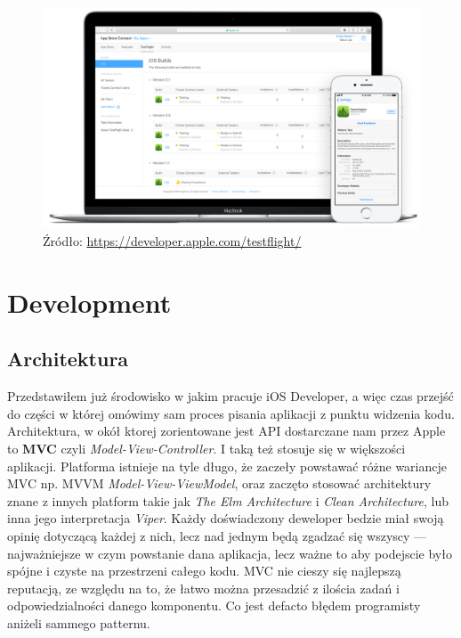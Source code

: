 \documentclass{article}
\begin{document}
\begin{figure}[h]
\centering
\includegraphics[width=12cm]{testflight-overview-hero-large_2x}
\caption{Źródło: \url{https://developer.apple.com/testflight/}}
\end{figure}


%
%
\section*{Development}
\subsection*{Architektura}
Przedstawiłem już środowisko w jakim pracuje iOS Developer, a więc czas przejść
do części w której omówimy sam proces pisania aplikacji z punktu widzenia kodu.
Architektura, w okół ktorej zorientowane jest API dostarczane nam przez Apple
to \textbf{MVC} czyli \textit{Model-View-Controller}. I taką też stosuje się w 
większości aplikacji. Platforma istnieje na tyle długo, że zaczeły powstawać różne
wariancje MVC np. MVVM \textit{Model-View-ViewModel}, oraz zaczęto stosować 
architektury znane z innych platform takie jak \textit{The Elm Architecture} i 
\textit{Clean Architecture}, lub inna jego interpretacja \textit{Viper}. Każdy 
doświadczony deweloper bedzie miał swoją opinię dotyczącą każdej z nich, lecz
nad jednym będą zgadzać się wszyscy --- najważniejsze w czym powstanie dana aplikacja,
lecz ważne to aby podejscie było spójne i czyste na przestrzeni całego kodu.
MVC nie cieszy się najlepszą reputacją, ze względu na to, że łatwo można przesadzić
z ilościa zadań i odpowiedzialności danego komponentu. Co jest defacto błędem
programisty aniżeli sammego patternu.
\end{document}
